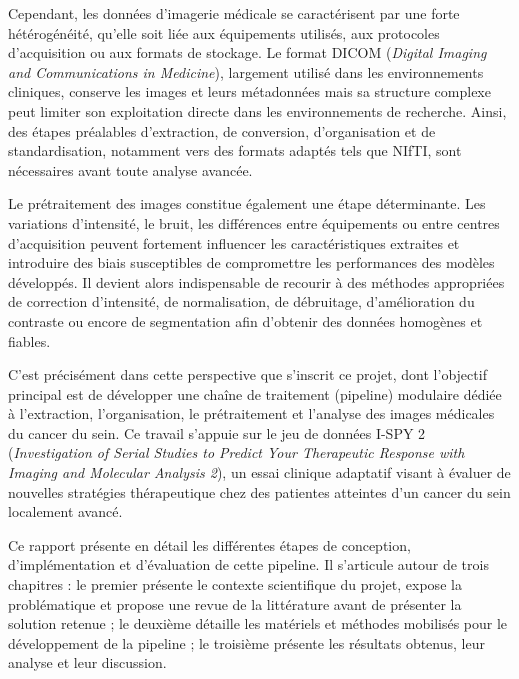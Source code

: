 \documentclass[12pt,a4paper]{report}
\begin{document}
    Cependant, les données d'imagerie médicale se caractérisent par une forte hétérogénéité, qu'elle soit liée aux équipements utilisés, aux protocoles d'acquisition ou aux formats de stockage. Le format DICOM (\textit{Digital Imaging and Communications in Medicine}), largement utilisé dans les environnements cliniques, conserve les images et leurs métadonnées mais sa structure complexe peut limiter son exploitation directe dans les environnements de recherche. Ainsi, des étapes préalables d'extraction, de conversion, d'organisation et de standardisation, notamment vers des formats adaptés tels que NIfTI, sont nécessaires avant toute analyse avancée.
    
    Le prétraitement des images constitue également une étape déterminante. Les variations d'intensité, le bruit, les différences entre équipements ou entre centres d'acquisition peuvent fortement influencer les caractéristiques extraites et introduire des biais susceptibles de compromettre les performances des modèles développés. Il devient alors indispensable de recourir à des méthodes appropriées de correction d'intensité, de normalisation, de débruitage, d'amélioration du contraste ou encore de segmentation afin d'obtenir des données homogènes et fiables.
    
    C'est précisément dans cette perspective que s'inscrit ce projet, dont l'objectif principal est de développer une chaîne de traitement (pipeline) modulaire dédiée à l'extraction, l'organisation, le prétraitement et l'analyse des images médicales du cancer du sein. Ce travail s'appuie sur le jeu de données I-SPY 2 (\textit{Investigation of Serial Studies to Predict Your Therapeutic Response with Imaging and Molecular Analysis 2}), un essai clinique adaptatif visant à évaluer de nouvelles stratégies thérapeutique chez des patientes atteintes d'un cancer du sein localement avancé.
    
    Ce rapport présente en détail les différentes étapes de conception, d'implémentation et d'évaluation de cette pipeline. Il s'articule autour de trois chapitres : le premier présente le contexte scientifique du projet, expose la problématique et propose une revue de la littérature avant de présenter la solution retenue ; le deuxième détaille les matériels et méthodes mobilisés pour le développement de la pipeline ; le troisième présente les résultats obtenus, leur analyse et leur discussion.

\end{document}

